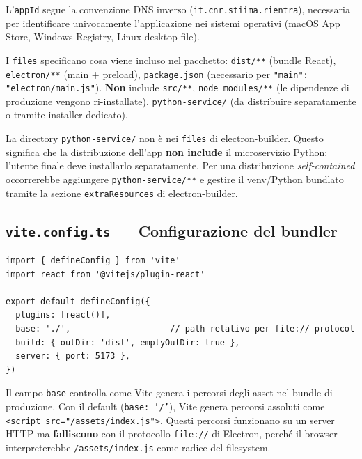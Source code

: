 \documentclass[a4paper,12pt]{article}
\renewcommand{\paragraph}[1]{%
  \par\vspace{4pt}%
  \noindent{\bfseries #1}\par\vspace{2pt}%
  \noindent\ignorespaces
}
\begin{document}
\noindent L'\texttt{appId} segue la convenzione DNS inverso (\texttt{it.cnr.stiima.rientra}),
necessaria per identificare univocamente l'applicazione nei sistemi
operativi (macOS App Store, Windows Registry, Linux desktop file).

I \texttt{files} specificano cosa viene incluso nel pacchetto:
\texttt{dist/**} (bundle React), \texttt{electron/**} (main + preload),
\texttt{package.json} (necessario per \texttt{"main": "electron/main.js"}).
\textbf{Non} include \texttt{src/**}, \texttt{node\_modules/**}
(le dipendenze di produzione vengono ri-installate), \texttt{python-service/}
(da distribuire separatamente o tramite installer dedicato).

\begin{warningbox}
La directory \texttt{python-service/} non \`{e} nei \texttt{files} di
electron-builder. Questo significa che la distribuzione dell'app
\textbf{non include} il microservizio Python: l'utente finale deve
installarlo separatamente. Per una distribuzione \textit{self-contained}
occorrerebbe aggiungere \texttt{python-service/**} e gestire il
venv/Python bundlato tramite la sezione \texttt{extraResources} di
electron-builder.
\end{warningbox}

\subsection{\texttt{vite.config.ts} --- Configurazione del bundler}

\begin{lstlisting}
import { defineConfig } from 'vite'
import react from '@vitejs/plugin-react'

export default defineConfig({
  plugins: [react()],
  base: './',                    // path relativo per file:// protocol
  build: { outDir: 'dist', emptyOutDir: true },
  server: { port: 5173 },
})
\end{lstlisting}

\noindent \paragraph{\texttt{base: './'} --- la scelta pi\`{u} critica}
Il campo \texttt{base} controlla come Vite genera i percorsi degli
asset nel bundle di produzione. Con il default (\texttt{base: '/'}),
Vite genera percorsi assoluti come \texttt{<script src="/assets/index.js">}.
Questi percorsi funzionano su un server HTTP ma \textbf{falliscono}
con il protocollo \texttt{file://} di Electron, perch\'{e} il browser
interpreterebbe \texttt{/assets/index.js} come radice del filesystem.
\end{document}

